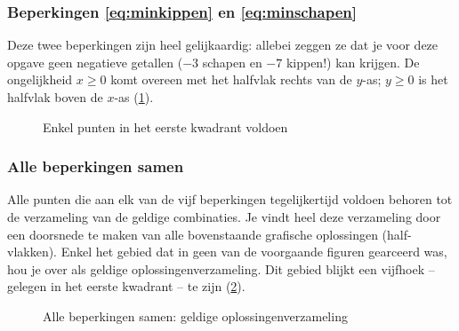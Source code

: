 \subsubsection{Beperkingen \eqref{eq:minkippen} en \eqref{eq:minschapen}}
Deze twee beperkingen zijn heel gelijkaardig: allebei zeggen
ze dat je voor deze opgave geen negatieve getallen ($-3$ schapen
en $-7$ kippen!) kan krijgen. De ongelijkheid $x \geqslant 0$ komt overeen met het halfvlak rechts van de
$y$-as; $y \geqslant 0$ is het halfvlak boven de $x$-as
(\cref{fig:eenkwadrant}).
\begin{figure}[htbp]
    \centering
{}
    \caption{Enkel punten in het eerste kwadrant voldoen}
    \label{fig:eenkwadrant}
\end{figure}



\subsubsection{Alle beperkingen samen}
Alle punten die aan elk van de vijf beperkingen tegelijkertijd voldoen
behoren tot de verzameling van de geldige combinaties. Je vindt
heel deze verzameling door een doorsnede te maken van alle bovenstaande
grafische oplossingen (half-vlakken). Enkel het gebied dat in
geen van de voorgaande figuren gearceerd was, hou je over als
geldige oplossingenverzameling. Dit gebied blijkt een vijfhoek
-- gelegen in het eerste kwadrant --
te zijn (\cref{fig:allebep}).
\begin{figure}[htbp]
    \centering
{}
    \caption{Alle beperkingen samen: geldige oplossingenverzameling}
    \label{fig:allebep}
\end{figure}



